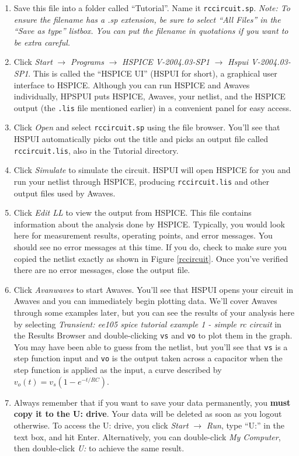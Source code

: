 \documentclass{article}
\begin{document}
\begin{enumerate}
\item Save this file into a folder called ``Tutorial''. Name it \verb|rccircuit.sp|. \textit{Note: To ensure the filename has a .sp extension, be sure to select ``All Files'' in the ``Save as type'' listbox. You can put the filename in quotations if you want to be extra careful.}
\item Click \textit{Start} $\rightarrow$ \textit{Programs} $\rightarrow$ \textit{HSPICE V-2004.03-SP1} $\rightarrow$ \textit{Hspui V-2004.03-SP1}. This is called the ``HSPICE UI'' (HSPUI for short), a graphical user interface to HSPICE. Although you can run HSPICE and Awaves individually, HPSPUI puts HSPICE, Awaves, your netlist, and the HSPICE output (the \verb|.lis| file mentioned earlier) in a convenient panel for easy access.
\item Click \textit{Open} and select \verb|rccircuit.sp| using the file browser. You'll see that HSPUI automatically picks out the title and picks an output file called \verb|rccircuit.lis|, also in the Tutorial directory.
\item Click \textit{Simulate} to simulate the circuit. HSPUI will open HSPICE for you and run your netlist through HSPICE, producing \verb|rccircuit.lis| and other output files used by Awaves.
\item Click \textit{Edit LL} to view the output from HSPICE. This file contains information about the analysis done by HSPICE. Typically, you would look here for measurement results, operating points, and error messages. You should see no error messages at this time. If you do, check to make sure you copied the netlist exactly as shown in Figure \ref{rccircuit}. Once you've verified there are no error messages, close the output file.
\item Click \textit{Avanwaves} to start Awaves. You'll see that HSPUI opens your circuit in Awaves and you can immediately begin plotting data. We'll cover Awaves through some examples later, but you can see the results of your analysis here by selecting \textit{Transient: ee105 spice tutorial example 1 - simple rc circuit} in the Results Browser and double-clicking \verb|vs| and \verb|vo| to plot them in the graph. You may have been able to guess from the netlist, but you'll see that \verb|vs| is a step function input and \verb|vo| is the output taken across a capacitor when the step function is applied as the input, a curve described by $v_o(t) = v_s\left(1-e^{-t/RC}\right)$.
\item Always remember that if you want to save your data permanently, you \textbf{must copy it to the U: drive}. Your data will be deleted as soon as you logout otherwise. To access the U: drive, you click \textit{Start} $\rightarrow$ \textit{Run}, type ``U:'' in the text box, and hit Enter. Alternatively, you can double-click \textit{My Computer}, then double-click \textit{U:} to achieve the same result.

\end{enumerate}
\end{document}
